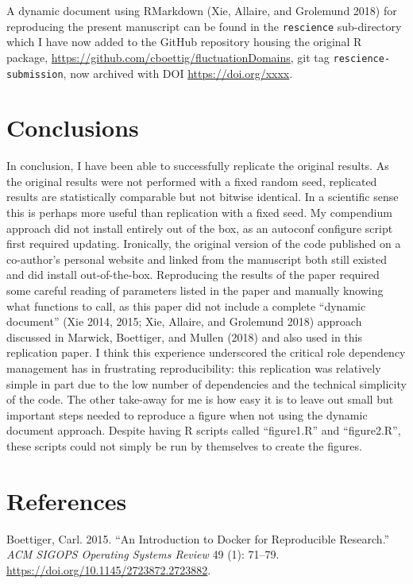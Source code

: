 \documentclass[
]{rescience}
\begin{document}
A dynamic document using RMarkdown (Xie, Allaire, and Grolemund 2018)
for reproducing the present manuscript can be found in the
\texttt{rescience} sub-directory which I have now added to the GitHub
repository housing the original R package,
\url{https://github.com/cboettig/fluctuationDomains}, git tag
\texttt{rescience-submission}, now archived with DOI
\url{https://doi.org/xxxx}.

\hypertarget{conclusions}{%
\section{Conclusions}\label{conclusions}}

In conclusion, I have been able to successfully replicate the original
results. As the original results were not performed with a fixed random
seed, replicated results are statistically comparable but not bitwise
identical. In a scientific sense this is perhaps more useful than
replication with a fixed seed. My compendium approach did not install
entirely out of the box, as an autoconf configure script first required
updating. Ironically, the original version of the code published on a
co-author's personal website and linked from the manuscript both still
existed and did install out-of-the-box. Reproducing the results of the
paper required some careful reading of parameters listed in the paper
and manually knowing what functions to call, as this paper did not
include a complete ``dynamic document'' (Xie 2014, 2015; Xie, Allaire,
and Grolemund 2018) approach discussed in Marwick, Boettiger, and Mullen
(2018) and also used in this replication paper. I think this experience
underscored the critical role dependency management has in frustrating
reproducibility: this replication was relatively simple in part due to
the low number of dependencies and the technical simplicity of the code.
The other take-away for me is how easy it is to leave out small but
important steps needed to reproduce a figure when not using the dynamic
document approach. Despite having R scripts called ``figure1.R'' and
``figure2.R'', these scripts could not simply be run by themselves to
create the figures.

\hypertarget{references}{%
\section*{References}\label{references}}

\hypertarget{refs}{}
\leavevmode\hypertarget{ref-Boettiger2015}{}%
Boettiger, Carl. 2015. ``An Introduction to Docker for Reproducible
Research.'' \emph{ACM SIGOPS Operating Systems Review} 49 (1): 71--79.
\url{https://doi.org/10.1145/2723872.2723882}.
\end{document}
